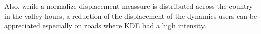 Also, while a normalize displacement meassure is distributed across the country in the valley hours, a reduction of the displacement of the dynamics users can be appreciated especially on roads where KDE had a high intensity.

\newpage

\begin{figure}
\centering
{}
\subfigure[Monday, 08:00]{
}
\end{figure}
